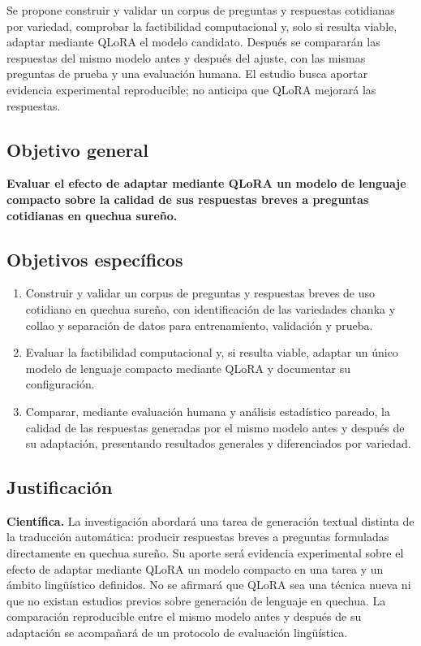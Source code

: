 Se propone construir y validar un corpus de preguntas y respuestas cotidianas por variedad, comprobar la factibilidad computacional y, solo si resulta viable, adaptar mediante QLoRA el modelo candidato. Después se compararán las respuestas del mismo modelo antes y después del ajuste, con las mismas preguntas de prueba y una evaluación humana. El estudio busca aportar evidencia experimental reproducible; no anticipa que QLoRA mejorará las respuestas.

\subsection{Objetivo general}\label{131-objetivo-general}

\textbf{Evaluar el efecto de adaptar mediante QLoRA un modelo de lenguaje compacto sobre la calidad de sus respuestas breves a preguntas cotidianas en quechua sureño.}

\subsection{Objetivos específicos}\label{132-objetivos-especuxedficos}

\begin{enumerate}
\def\labelenumi{\arabic{enumi}.}
\item
  Construir y validar un corpus de preguntas y respuestas breves de uso cotidiano en quechua sureño, con identificación de las variedades chanka y collao y separación de datos para entrenamiento, validación y prueba.
\item
  Evaluar la factibilidad computacional y, si resulta viable, adaptar un único modelo de lenguaje compacto mediante QLoRA y documentar su configuración.
\item
  Comparar, mediante evaluación humana y análisis estadístico pareado, la calidad de las respuestas generadas por el mismo modelo antes y después de su adaptación, presentando resultados generales y diferenciados por variedad.
\end{enumerate}



\subsection{Justificación}\label{justificacion-de-la-investigacion}

\noindent\textbf{Científica.} La investigación abordará una tarea de generación textual distinta de la traducción automática: producir respuestas breves a preguntas formuladas directamente en quechua sureño. Su aporte será evidencia experimental sobre el efecto de adaptar mediante QLoRA un modelo compacto en una tarea y un ámbito lingüístico definidos. No se afirmará que QLoRA sea una técnica nueva ni que no existan estudios previos sobre generación de lenguaje en quechua. La comparación reproducible entre el mismo modelo antes y después de su adaptación se acompañará de un protocolo de evaluación lingüística.

